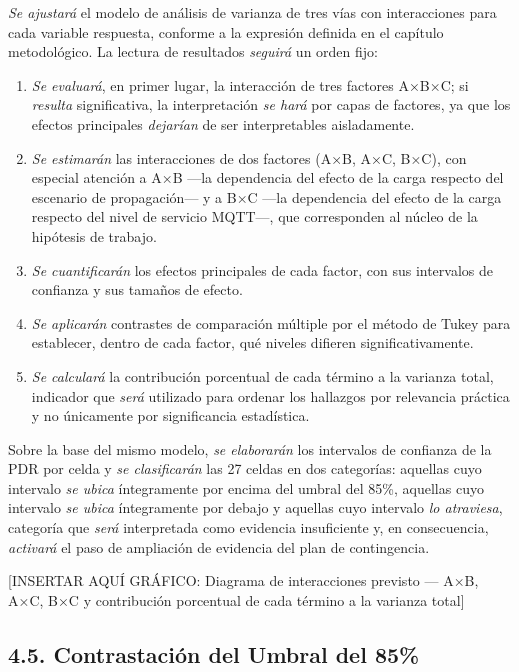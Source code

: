 \documentclass[
  12pt,
]{article}
\providecommand{\tightlist}{%
  \setlength{\itemsep}{0pt}\setlength{\parskip}{0pt}}
\begin{document}
\emph{Se ajustará} el modelo de análisis de varianza de tres vías con
interacciones para cada variable respuesta, conforme a la expresión
definida en el capítulo metodológico. La lectura de resultados
\emph{seguirá} un orden fijo:

\begin{enumerate}
\def\labelenumi{\arabic{enumi}.}
\tightlist
\item
  \emph{Se evaluará}, en primer lugar, la interacción de tres factores
  A×B×C; si \emph{resulta} significativa, la interpretación \emph{se
  hará} por capas de factores, ya que los efectos principales
  \emph{dejarían} de ser interpretables aisladamente.
\item
  \emph{Se estimarán} las interacciones de dos factores (A×B, A×C, B×C),
  con especial atención a A×B —la dependencia del efecto de la carga
  respecto del escenario de propagación— y a B×C —la dependencia del
  efecto de la carga respecto del nivel de servicio MQTT—, que
  corresponden al núcleo de la hipótesis de trabajo.
\item
  \emph{Se cuantificarán} los efectos principales de cada factor, con
  sus intervalos de confianza y sus tamaños de efecto.
\item
  \emph{Se aplicarán} contrastes de comparación múltiple por el método
  de Tukey para establecer, dentro de cada factor, qué niveles difieren
  significativamente.
\item
  \emph{Se calculará} la contribución porcentual de cada término a la
  varianza total, indicador que \emph{será} utilizado para ordenar los
  hallazgos por relevancia práctica y no únicamente por significancia
  estadística.
\end{enumerate}

Sobre la base del mismo modelo, \emph{se elaborarán} los intervalos de
confianza de la PDR por celda y \emph{se clasificarán} las 27 celdas en
dos categorías: aquellas cuyo intervalo \emph{se ubica} íntegramente por
encima del umbral del 85\%, aquellas cuyo intervalo \emph{se ubica}
íntegramente por debajo y aquellas cuyo intervalo \emph{lo atraviesa},
categoría que \emph{será} interpretada como evidencia insuficiente y, en
consecuencia, \emph{activará} el paso de ampliación de evidencia del
plan de contingencia.

{[}INSERTAR AQUÍ GRÁFICO: Diagrama de interacciones previsto — A×B, A×C,
B×C y contribución porcentual de cada término a la varianza total{]}

\subsection{4.5. Contrastación del Umbral del
85\%}\label{contrastaciuxf3n-del-umbral-del-85}
\end{document}
